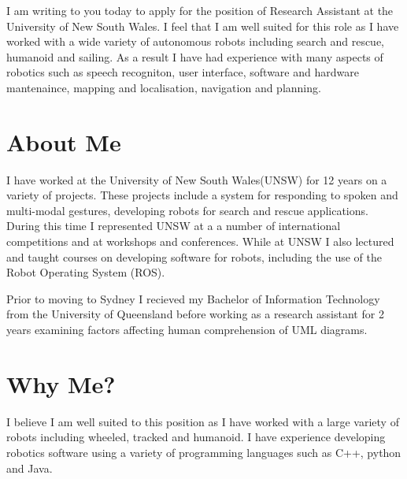 \documentclass[11pt, a4paper]{awesome-deedy}
\begin{document}
\makecvheader

\makelettertitle

\begin{cvletter}

I am writing to you today to apply for the position of Research Assistant at the University of New South Wales.  I feel that I am well suited for this role as I have worked with a wide variety of autonomous robots including search and rescue, humanoid and sailing.  As a result I have had experience with many aspects of robotics such as speech recogniton, user interface, software and hardware mantenaince, mapping and localisation, navigation and planning. 

\section{About Me}

I have worked at the University of New South Wales(UNSW) for 12 years on a variety of projects.  These projects include a system for responding to spoken and multi-modal gestures, developing robots for search and rescue applications.  During this time I represented UNSW at a a number of international competitions and at workshops and conferences.  While at UNSW I also lectured and taught courses on developing software for robots, including the use of the Robot Operating System (ROS).

Prior to moving to Sydney I recieved my Bachelor of Information Technology from the University of Queensland before working as a research assistant for 2 years examining factors affecting human comprehension of UML diagrams.


\section{Why Me?}

I believe I am well suited to this position as I have worked with a large variety of robots including wheeled, tracked and humanoid.  I have experience developing robotics software using a variety of programming languages such as C++, python and Java.

\end{cvletter}

\makeletterclosing
\end{document}
